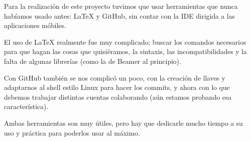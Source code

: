 \documentclass{article}
\begin{document}
Para la realización de este proyecto tuvimos que usar herramientas que nunca habíamos usado antes: \LaTeX{} y GitHub, sin contar con la IDE dirigida a las aplicaciones móbiles.

El uso de \LaTeX{} realmente fue muy complicado; buscar los comandos necesarios para que hagan las cosas que quisiéramos, la sintaxis, las incompatibilidades y la falta de algunas librerías (como la de Beamer al principio).

Con GitHub también se nos complicó un poco, con la creación de llaves y adaptarnos al shell estilo Linux para hacer los commits, y ahora con lo que debemos trabajar distintas cuentas colaborando (aún estamos probando esa característica).

Ambas herramientas son muy útiles, pero hay que dedicarle mucho tiempo a su uso y práctica para poderlos usar al máximo.
\end{document}
